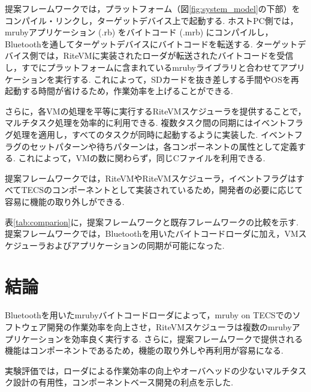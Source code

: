 \documentclass[a4j,10pt,twocolumn]{utf8/abstract}
\begin{document}
提案フレームワークでは，プラットフォーム（図\ref{fig:system_model}の下部）をコンパイル・リンクし，ターゲットデバイス上で起動する.
ホストPC側では，mrubyアプリケーション (.rb) をバイトコード (.mrb) にコンパイルし，Bluetoothを通してターゲットデバイスにバイトコードを転送する.
ターゲットデバイス側では，RiteVMに実装されたローダが転送されたバイトコードを受信し，すでにプラットフォームに含まれているmrubyライブラリと合わせてアプリケーションを実行する.
これによって，SDカードを抜き差しする手間やOSを再起動する時間が省けるため，作業効率を上げることができる.

さらに，各VMの処理を平等に実行するRiteVMスケジューラを提供することで，マルチタスク処理を効率的に利用できる.
複数タスク間の同期にはイベントフラグ処理を適用し，すべてのタスクが同時に起動するように実装した.
イベントフラグのセットパターンや待ちパターンは，各コンポーネントの属性として定義する.
これによって，VMの数に関わらず，同じCファイルを利用できる.

提案フレームワークでは，RiteVMやRiteVMスケジューラ，イベントフラグはすべてTECSのコンポーネントとして実装されているため，開発者の必要に応じて容易に機能の取り外しができる.

表\ref{tab:comparion}に，提案フレームワークと既存フレームワークの比較を示す.
提案フレームワークでは，Bluetoothを用いたバイトコードローダに加え，VMスケジューラおよびアプリケーションの同期が可能になった.

\section{結論}
Bluetoothを用いたmrubyバイトコードローダによって，mruby on TECSでのソフトウェア開発の作業効率を向上させ，RiteVMスケジューラは複数のmrubyアプリケーションを効率良く実行する.
さらに，提案フレームワークで提供される機能はコンポーネントであるため，機能の取り外しや再利用が容易になる.

実験評価では，ローダによる作業効率の向上やオーバヘッドの少ないマルチタスク設計の有用性，コンポーネントベース開発の利点を示した.
\end{document}
